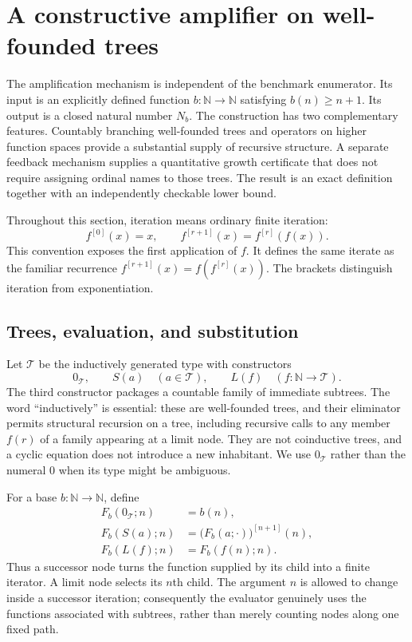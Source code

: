\section{A constructive amplifier on well-founded trees}
\label{amp:construction}

The amplification mechanism is independent of the benchmark enumerator.  Its
input is an explicitly defined function $b:\mathbb N\to\mathbb N$ satisfying
$b(n)\geq n+1$.  Its output is a closed natural number $N_b$.  The construction
has two complementary features.  Countably branching well-founded trees and
operators on higher function spaces provide a substantial supply of recursive
structure.  A separate feedback mechanism supplies a quantitative growth
certificate that does not require assigning ordinal names to those trees.
The result is an exact definition together with an independently checkable
lower bound.

Throughout this section, iteration means ordinary finite iteration:
\[
 f^{[0]}(x)=x,
 \qquad f^{[r+1]}(x)=f^{[r]}(f(x)).
\]
This convention exposes the first application of $f$.  It defines the same
iterate as the familiar recurrence $f^{[r+1]}(x)=f(f^{[r]}(x))$.
The brackets distinguish iteration from exponentiation.

\subsection{Trees, evaluation, and substitution}
\label{amp:trees}

Let $\mathcal T$ be the inductively generated type with constructors
\[
 0_{\mathcal T},\qquad
 S(a)\quad(a\in\mathcal T),\qquad
 L(f)\quad(f:\mathbb N\to\mathcal T).
\]
The third constructor packages a countable family of immediate subtrees.
The word ``inductively'' is essential: these are well-founded trees, and their
eliminator permits structural recursion on a tree, including recursive calls
to any member $f(r)$ of a family appearing at a limit node.  They are not
coinductive trees, and a cyclic equation does not introduce a new inhabitant.
We use $0_{\mathcal T}$ rather than the numeral $0$ when its type might be
ambiguous.

For a base $b:\mathbb N\to\mathbb N$, define
\begin{align}
 F_b(0_{\mathcal T};n)&=b(n),\label{amp:eq:fastzero}\\
 F_b(S(a);n)&=\bigl(F_b(a;\mathord\cdot)\bigr)^{[n+1]}(n),
 \label{amp:eq:fastsucc}\\
 F_b(L(f);n)&=F_b(f(n);n).
 \label{amp:eq:fastlimit}
\end{align}
Thus a successor node turns the function supplied by its child into a finite
iterator.  A limit node selects its $n$th child.  The argument $n$ is allowed
to change inside a successor iteration; consequently the evaluator genuinely
uses the functions associated with subtrees, rather than merely counting
nodes along one fixed path.

